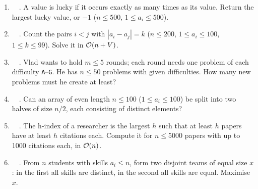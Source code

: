 \exlegend
\begin{enumerate}[leftmargin=*, label=\textbf{E5.\arabic*}, itemsep=6pt]
    \item \exeasy\ \pconcept {}\ . A value is lucky if it occurs exactly as many times as its value. Return the largest lucky value, or $-1$ ($n \le 500$, $1 \le a_i \le 500$).
    \item \exeasy\ \pconcept {}\ . Count the pairs $i < j$ with $|a_i - a_j| = k$ ($n \le 200$, $1 \le a_i \le 100$, $1 \le k \le 99$). Solve it in $\mathcal{O}(n + V)$.
    \item \exeasy\ \precent {}\ . Vlad wants to hold $m \le 5$ rounds; each round needs one problem of each difficulty \texttt{A}--\texttt{G}. He has $n \le 50$ problems with given difficulties. How many new problems must he create at least?
    \item \exeasy\ \ptricky {}\ . Can an array of even length $n \le 100$ ($1 \le a_i \le 100$) be split into two halves of size $n/2$, each consisting of distinct elements?
    \item \exmedium\ \pclassic {}\ . The h-index of a researcher is the largest $h$ such that at least $h$ papers have at least $h$ citations each. Compute it for $n \le 5000$ papers with up to 1000 citations each, in $\mathcal{O}(n)$.
    \item \exmedium\ \ptricky {}\ . From $n$ students with skills $a_i \le n$, form two disjoint teams of equal size $x$: in the first all skills are distinct, in the second all skills are equal. Maximise $x$.
\end{enumerate}

